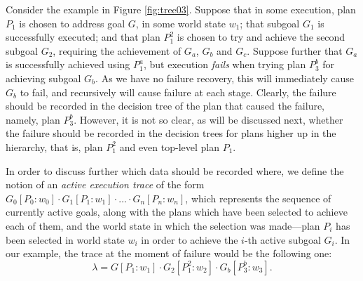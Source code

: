 Consider the example in Figure \ref{fig:tree03}. 
%
Suppose that in some execution, plan $P_1$ is chosen to address goal $G$, in some world state $w_1$;
that subgoal $G_1$ is successfully executed; and that plan $P_1^2$ is chosen to try and achieve
the second subgoal $G_2$, requiring the achievement of $G_a$, $G_b$ and $G_c$.
%
Suppose further that $G_a$ is successfully achieved using $P_1^a$, but execution \emph{fails}
when trying plan $P_3^b$ for achieving subgoal $G_b$.  As we have no failure recovery, this will
immediately cause $G_b$ to fail, and recursively will cause failure at each stage. 
%
Clearly, the failure should be recorded in the decision tree of the plan that caused the
failure, namely, plan $P_3^b$. However, it is not so clear, as will be discussed next, whether the
failure should be recorded in the decision trees for plans higher up in the hierarchy, that is,
plan $P_1^2$ and even top-level plan $P_1$.



In order to discuss further which data should be recorded where, we
define the notion of an \textit{active execution trace} of the form
$G_0[P_0:w_0] \cdot G_1[P_1:w_1] \cdot \ldots \cdot G_n[P_n:w_n]$, which
represents the sequence of currently active goals, along with the plans which 
have been selected to achieve each of them, and the world state in which the selection 
was made---plan $P_i$ has been selected in world state $w_i$ in order to achieve the $i$-th
active subgoal $G_i$.
%
In our example, the trace at the moment of failure would be the following one:
\[
\lambda=G[P_1:w_1] \cdot G_2[P_1^2:w_2] \cdot G_b[P_3^b:w_3].
\]

